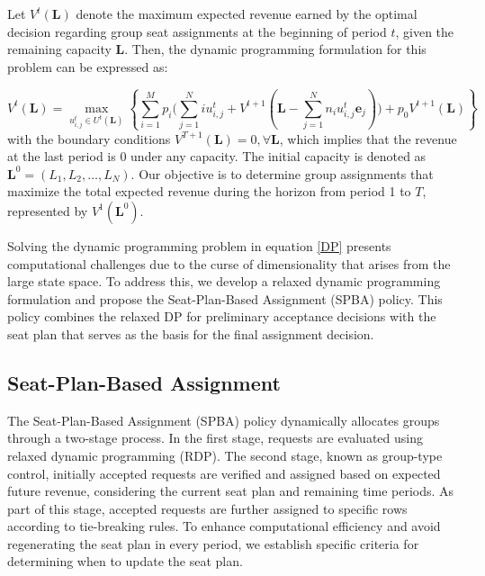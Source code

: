 Let $V^{t}(\mathbf{L})$ denote the maximum expected revenue earned by the optimal decision regarding group seat assignments at the beginning of period $t$, given the remaining capacity $\mathbf{L}$. Then, the dynamic programming formulation for this problem can be expressed as:

\begin{equation}\label{DP}
V^{t}(\mathbf{L}) = \max_{u_{i,j}^{t} \in U^{t}(\mathbf{L})}\left\{\sum_{i=1}^{M} p_i \bigl( \sum_{j=1}^{N} i u_{i,j}^{t} + V^{t+1}(\mathbf{L} - \sum_{j=1}^{N} n_i u_{i,j}^{t}\mathbf{e}_j)\bigr) + p_0 V^{t+1}(\mathbf{L})\right\}
\end{equation}
with the boundary conditions $V^{T+1}(\mathbf{L}) = 0, \forall \mathbf{L}$, which implies that the revenue at the last period is 0 under any capacity. The initial capacity is denoted as $\mathbf{L}^{0} = (L_1, L_2, \ldots, L_N)$. Our objective is to determine group assignments that maximize the total expected revenue during the horizon from period 1 to $T$, represented by $V^{1}(\mathbf{L}^{0})$.


Solving the dynamic programming problem in equation \eqref{DP} presents computational challenges due to the curse of dimensionality that arises from the large state space. To address this, we develop a relaxed dynamic programming formulation and propose the Seat-Plan-Based Assignment (SPBA) policy. This policy combines the relaxed DP for preliminary acceptance decisions with the seat plan that serves as the basis for the final assignment decision.



\subsection{Seat-Plan-Based Assignment}
The Seat-Plan-Based Assignment (SPBA) policy dynamically allocates groups through a two-stage process. In the first stage, requests are evaluated using relaxed dynamic programming (RDP). The second stage, known as group-type control, initially accepted requests are verified and assigned based on expected future revenue, considering the current seat plan and remaining time periods. As part of this stage, accepted requests are further assigned to specific rows according to tie-breaking rules. To enhance computational efficiency and avoid regenerating the seat plan in every period, we establish specific criteria for determining when to update the seat plan.

